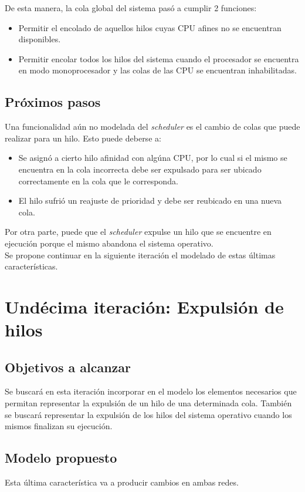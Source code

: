 \documentclass[a4paper]{book}
\begin{document}
De esta manera, la cola global del sistema pas\'o a cumplir 2 funciones:
\begin{itemize}
\item Permitir el encolado de aquellos hilos cuyas CPU afines no se encuentran disponibles.
\item Permitir encolar todos los hilos del sistema cuando el procesador se encuentra en modo monoprocesador y las colas de las CPU se encuentran inhabilitadas.
\end{itemize}

\subsection{Pr\'oximos pasos}
Una funcionalidad a\'un no modelada del \emph{scheduler} es el cambio de colas que puede realizar para un hilo. Esto puede deberse a:
\begin{itemize}
\item Se asign\'o a cierto hilo afinidad con alg\'una CPU, por lo cual si el mismo se encuentra en la cola incorrecta debe ser expulsado para ser ubicado correctamente en la cola que le corresponda.
\item El hilo sufri\'o un reajuste de prioridad y debe ser reubicado en una nueva cola.
\end{itemize}

Por otra parte, puede que el \emph{scheduler} expulse un hilo que se encuentre en ejecuci\'on porque el mismo abandona el sistema operativo.\\

Se propone continuar en la siguiente iteraci\'on el modelado de estas \'ultimas caracter\'isticas.


\newpage
\section{Und\'ecima iteraci\'on: Expulsi\'on de hilos}

\subsection{Objetivos a alcanzar}
Se buscar\'a en esta iteraci\'on incorporar en el modelo los elementos necesarios que permitan representar la expulsi\'on de un hilo de una determinada cola. Tambi\'en se buscar\'a representar la expulsi\'on de los hilos del sistema operativo cuando los mismos finalizan su ejecuci\'on.

\subsection{Modelo propuesto}
Esta \'ultima caracter\'istica va a producir cambios en ambas redes.\\
\end{document}
